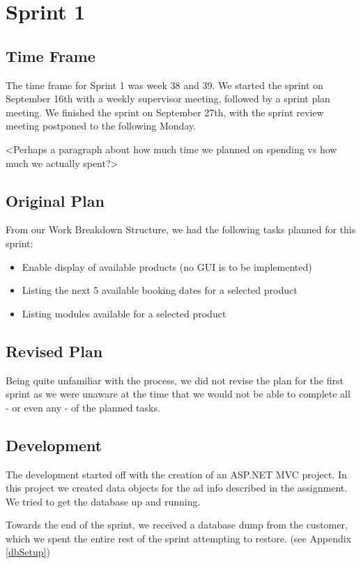 \section{Sprint 1}

\subsection{Time Frame}
The time frame for Sprint 1 was week 38 and 39. We started the sprint on September 16th with a weekly supervisor meeting, followed by a sprint plan meeting. We finished the sprint on September 27th, with the sprint review meeting postponed to the following Monday.

<Perhaps a paragraph about how much time we planned on spending vs how much we actually spent?>

\subsection{Original Plan}
From our Work Breakdown Structure, we had the following tasks planned for this sprint:
\begin{itemize}
	\item Enable display of available products (no GUI is to be implemented)
	\item Listing the next 5 available booking dates for a selected product
	\item Listing modules available for a selected product
\end{itemize}

\subsection{Revised Plan}
Being quite unfamiliar with the process, we did not revise the plan for the first sprint as we were unaware at the time that we would not be able to complete all - or even any - of the planned tasks.

\subsection{Development}
The development started off with the creation of an ASP.NET MVC project. In this project we created data objects for the ad info described in the assignment. We tried to get the database up and running.

Towards the end of the sprint, we received a database dump from the customer, which we spent the entire rest of the sprint attempting to restore. (see Appendix \ref{dbSetup})


